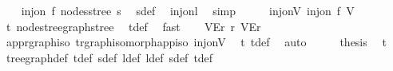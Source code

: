 \begin{isabellebody}
\ \ \isamarkupfalse%
\ {\isachardoublequoteopen}inj{\isacharunderscore}{\kern0pt}on\ f\ {\isacharparenleft}{\kern0pt}nodes{\isacharunderscore}{\kern0pt}stree\ s{\isacharprime}{\kern0pt}{\isacharparenright}{\kern0pt}{\isachardoublequoteclose}\ \isamarkupfalse%
\ s{\isacharprime}{\kern0pt}{\isacharunderscore}{\kern0pt}def\ \isamarkupfalse%
\ inj{\isacharunderscore}{\kern0pt}on{\isacharunderscore}{\kern0pt}l{\isacharprime}{\kern0pt}\ \isamarkupfalse%
\ simp\isanewline
\ \ \isamarkupfalse%
\ \isamarkupfalse%
\ inj{\isacharunderscore}{\kern0pt}on{\isacharunderscore}{\kern0pt}V{\isacharprime}{\kern0pt}{\isacharcolon}{\kern0pt}\ {\isachardoublequoteopen}inj{\isacharunderscore}{\kern0pt}on\ f\ V{\isacharprime}{\kern0pt}{\isachardoublequoteclose}\ \isamarkupfalse%
\ t{\isacharprime}{\kern0pt}\ nodes{\isacharunderscore}{\kern0pt}tree{\isacharunderscore}{\kern0pt}graph{\isacharunderscore}{\kern0pt}stree\ \isamarkupfalse%
\ t{\isacharprime}{\kern0pt}{\isacharunderscore}{\kern0pt}def\ \isamarkupfalse%
\ fast\isanewline
\ \ \isamarkupfalse%
\ {\isachardoublequoteopen}{\isacharparenleft}{\kern0pt}V{\isacharprime}{\kern0pt}{\isacharcomma}{\kern0pt}E{\isacharprime}{\kern0pt}{\isacharcomma}{\kern0pt}r{\isacharprime}{\kern0pt}{\isacharparenright}{\kern0pt}\ {\isasymsimeq}\isactrlsub r\ {\isacharparenleft}{\kern0pt}V{\isacharcomma}{\kern0pt}E{\isacharcomma}{\kern0pt}r{\isacharparenright}{\kern0pt}{\isachardoublequoteclose}\ \isamarkupfalse%
\ app{\isacharunderscore}{\kern0pt}rgraph{\isacharunderscore}{\kern0pt}iso\ t{\isacharprime}{\kern0pt}{\isachardot}{\kern0pt}rgraph{\isacharunderscore}{\kern0pt}isomorph{\isacharunderscore}{\kern0pt}app{\isacharunderscore}{\kern0pt}iso\ inj{\isacharunderscore}{\kern0pt}on{\isacharunderscore}{\kern0pt}V{\isacharprime}{\kern0pt}\ \isamarkupfalse%
\ t{\isacharprime}{\kern0pt}\ t{\isacharunderscore}{\kern0pt}def\ \isamarkupfalse%
\ auto\isanewline
\ \ \isamarkupfalse%
\ \isamarkupfalse%
\ {\isacharquery}{\kern0pt}thesis\ \isamarkupfalse%
\ t{\isacharprime}{\kern0pt}\ \isamarkupfalse%
\ tree{\isacharunderscore}{\kern0pt}graph{\isacharunderscore}{\kern0pt}def\ t{\isacharunderscore}{\kern0pt}def\ s{\isacharunderscore}{\kern0pt}def\ l{\isacharunderscore}{\kern0pt}def\ l{\isacharprime}{\kern0pt}{\isacharunderscore}{\kern0pt}def\ s{\isacharprime}{\kern0pt}{\isacharunderscore}{\kern0pt}def\ t{\isacharprime}{\kern0pt}{\isacharunderscore}{\kern0pt}def\ \isamarkupfalse%

\end{isabellebody}
